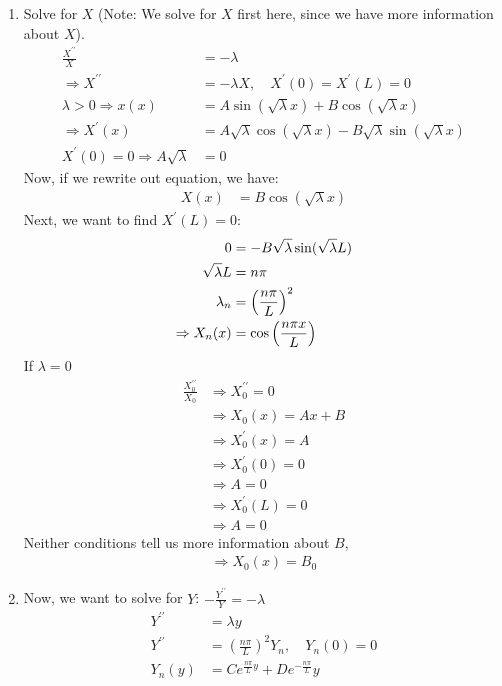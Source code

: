 \documentclass{article}
\begin{document}
\begin{enumerate}
  \item Solve for $X$ (Note: We solve for $X$ first here, since we have more information about $X$).
  \begin{align}
    \frac{X^{\prime\prime}}{X} & = - \lambda\\
    \Rightarrow X^{\prime\prime} & = - \lambda X, \quad X^\prime(0) = X^\prime(L) = 0\\
    \lambda > 0 \Rightarrow x(x) & = A \sin(\sqrt \lambda x) + B \cos(\sqrt \lambda x)\\
    \Rightarrow X^\prime(x) & = A \sqrt \lambda \cos(\sqrt \lambda x) - B \sqrt \lambda \sin(\sqrt \lambda x)\\
    X^\prime(0) = 0 \Rightarrow A \sqrt \lambda & = 0
  \end{align}
Now, if we rewrite out equation, we have:
\begin{align}
  X(x) & = B \cos(\sqrt \lambda x)
\end{align}
Next, we want to find $X^\prime(L) = 0$:
\begin{align}
  0 & = - B \sqrt \lambda \sin(\sqrt \lambda L)\\
  \sqrt \lambda L & = n \pi\\
  \lambda_n & = \left(\frac{n \pi}{L}\right)^2\\
  \Rightarrow X_n(x) & = \cos \Big( \frac{n \pi x}{L} \Big)
\end{align}
If $\lambda = 0$
\begin{align}
  \frac{X^{\prime\prime}_0}{X_0} & \Rightarrow X^{\prime\prime}_0 = 0\\
  & \Rightarrow X_0(x) = Ax + B\\
  & \Rightarrow X^\prime_0(x) = A\\
  & \Rightarrow X^\prime_0(0) = 0\\
  & \Rightarrow A = 0\\
  & \Rightarrow X^\prime_0(L) = 0\\
  & \Rightarrow A = 0
\end{align}
Neither conditions tell us more information about $B$,
\begin{align}
  \Rightarrow X_0(x) = B_0
\end{align}
\item Now, we want to solve for $Y$: $- \frac{Y^{\prime\prime}}{Y} = -\lambda$
\begin{align}
  Y^{\prime\prime} & = \lambda y\\
  Y^{\prime\prime} & = \left( \frac{n \pi}{L} \right)^2 Y_n, \quad Y_n(0) = 0\\
  Y_n(y) & = Ce^{\frac{n \pi}{L}y} + De^{- \frac{n \pi}{L}}y\\

\end{align}
\end{enumerate}
\end{document}
